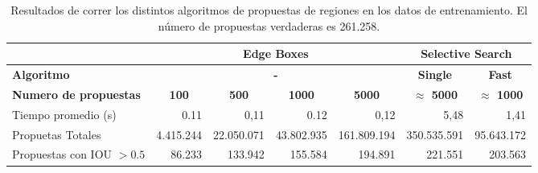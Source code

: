 \begin{table}[]
	\centering
	\resizebox{12.5cm}{!} {
		\begin{tabular}{|l|c|r|r|r|c|r|}
			\hline
			\textbf{}                     & \multicolumn{4}{c|}{\textbf{Edge Boxes}}                                                                                                   & \multicolumn{2}{c|}{\textbf{Selective Search}}               \\ \hline
			\textbf{Algoritmo}            & \multicolumn{4}{c|}{\textbf{-}}                                                                                                            & \textbf{Single}         & \multicolumn{1}{c|}{\textbf{Fast}} \\ \hline
			\textbf{Numero de propuestas} & \textbf{100}                 & \multicolumn{1}{c|}{\textbf{500}} & \multicolumn{1}{c|}{\textbf{1000}} & \multicolumn{1}{c|}{\textbf{5000}} & \textbf{$\approx$ 5000} & \multicolumn{1}{c|}{\textbf{$\approx$ 1000}}  \\ \hline
			Tiempo promedio (s)           & \multicolumn{1}{r|}{0.11}    & 0,11                              & 0.12                               & 0,12                               & \multicolumn{1}{r|}{5,48}   &         1,41                           \\ \hline
			Propuetas Totales             & \multicolumn{1}{r|}{4.415.244} & 22.050.071                          & 43.802.935                           & 161.809.194                          & \multicolumn{1}{r|}{350.535.591}   &   95.643.172                                 \\ \hline
			Propuestas con IOU $> 0.5$    & \multicolumn{1}{r|}{86.233}   & 133.942                            & 155.584                             & 194.891                             & \multicolumn{1}{r|}{221.551}   & 203.563                                   \\ \hline
		\end{tabular}
	}
	\caption{Resultados de correr los distintos algoritmos de propuestas de regiones en los datos de entrenamiento. El número de propuestas verdaderas es 261.258.}
	\label{tab:edgeVSselct}
\end{table}



